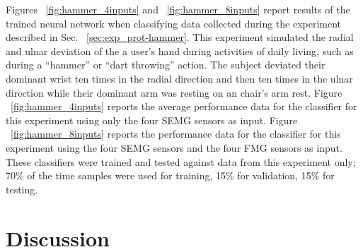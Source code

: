 \documentclass[twocolumn]{sagej}
\begin{document}
Figures ~\ref{fig:hammer_4inputs} and ~\ref{fig:hammer_8inputs} report results of the trained neural network when classifying data collected during the experiment described in Sec. ~\ref{sec:exp_prot-hammer}.  This experiment simulated the radial and ulnar deviation of the a user's hand during activities of daily living, such as during a ``hammer'' or ``dart throwing'' action.  The subject deviated their dominant wrist ten times in the radial direction and then ten times in the ulnar direction while their dominant arm was resting on an chair's arm rest.  Figure ~\ref{fig:hammer_4inputs} reports the average performance data for the classifier for this experiment using only the four SEMG sensors as input.  Figure ~\ref{fig:hammer_8inputs} reports the performance data for the classifier for this experiment using the four SEMG sensors and the four FMG sensors as input.  These classifiers were trained and tested against data from this experiment only; 70\% of the time samples were used for training, 15\% for validation, 15\% for testing. \par \noindent

\section{Discussion} 
\label{sec:discussion}
\end{document}
